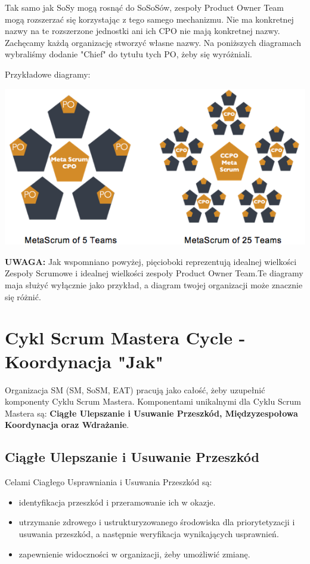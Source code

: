 \documentclass[12pt,a4paper,parskip=full]{scrartcl}
\begin{document}
Tak samo jak SoSy mogą rosnąć do SoSoSów, zespoły Product Owner Team mogą rozszerzać się korzystając z tego samego mechanizmu. Nie ma konkretnej nazwy na te rozszerzone jednostki ani ich CPO nie mają konkretnej nazwy. Zachęcamy każdą organizację stworzyć własne nazwy. Na poniższych diagramach wybraliśmy dodanie "Chief" do tytułu tych PO, żeby się wyróżniali.

Przykładowe diagramy:

\includegraphics[width=1.0\linewidth]{MetaScrum-R2.png}

\textbf{UWAGA:} Jak wspomniano powyżej, pięcioboki reprezentują idealnej wielkości Zespoły Scrumowe i idealnej wielkości zespoły Product Owner Team.Te diagramy maja służyć wyłącznie jako przykład, a diagram twojej organizacji może znacznie się różnić.

\section{Cykl Scrum Mastera Cycle - Koordynacja "Jak"}

Organizacja SM (SM, SoSM, EAT) pracują jako całość, żeby uzupełnić komponenty Cyklu Scrum Mastera. Komponentami unikalnymi dla Cyklu Scrum Mastera są: \textbf{Ciągłe Ulepszanie i Usuwanie Przeszkód, Międzyzespołowa Koordynacja oraz Wdrażanie}.
\subsection{Ciągłe Ulepszanie i Usuwanie Przeszkód}

Celami Ciagłego Usprawniania i Usuwania Przeszkód są:

\begin{itemize}
	\item identyfikacja przeszkód i przeramowanie ich w okazje.
	\item utrzymanie zdrowego i ustrukturyzowanego środowiska dla priorytetyzacji i usuwania przeszkód, a następnie weryfikacja wynikających usprawnień.
	\item zapewnienie widoczności w organizacji, żeby umożliwić zmianę.
\end{itemize}
\end{document}
